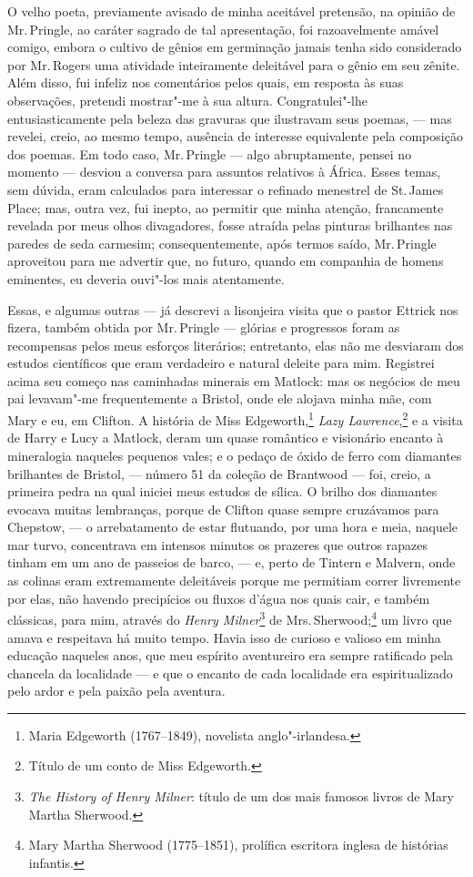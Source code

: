 O velho poeta, previamente avisado de minha aceitável pretensão, na
opinião de Mr.\,Pringle, ao caráter sagrado de tal apresentação, foi
razoavelmente amável comigo, embora o cultivo de gênios em germinação
jamais tenha sido considerado por Mr.\,Rogers uma atividade inteiramente
deleitável para o gênio em seu zênite. Além disso, fui infeliz nos
comentários pelos quais, em resposta às suas observações, pretendi
mostrar"-me à sua altura. Congratulei"-lhe entusiasticamente pela beleza
das gravuras que ilustravam seus poemas, --- mas revelei, creio, ao mesmo
tempo, ausência de interesse equivalente pela composição dos poemas. Em
todo caso, Mr.\,Pringle --- algo abruptamente, pensei no momento --- desviou
a conversa para assuntos relativos à África. Esses temas, sem dúvida,
eram calculados para interessar o refinado menestrel de St.\,James Place;
mas, outra vez, fui inepto, ao permitir que minha atenção, francamente
revelada por meus olhos divagadores, fosse atraída pelas pinturas
brilhantes nas paredes de seda carmesim; consequentemente, após termos
saído, Mr.\,Pringle aproveitou para me advertir que, no futuro, quando em
companhia de homens eminentes, eu deveria ouvi"-los mais atentamente.

Essas, e algumas outras --- já descrevi a lisonjeira visita que o
pastor Ettrick nos fizera, também obtida por Mr.\,Pringle --- glórias e
progressos foram as recompensas pelos meus esforços literários;
entretanto, elas não me desviaram dos estudos científicos que eram
verdadeiro e natural deleite para mim. Registrei acima seu começo nas
caminhadas minerais em Matlock: mas os negócios de meu pai levavam"-me
frequentemente a Bristol, onde ele alojava minha mãe, com Mary e eu, em
Clifton. A história de Miss Edgeworth,\footnote{Maria Edgeworth
  (1767--1849), novelista anglo"-irlandesa.} \textit{Lazy
Lawrence},\footnote{Título de um conto de Miss Edgeworth.}
e a visita de Harry e Lucy a Matlock, deram um quase romântico e
visionário encanto à mineralogia naqueles pequenos vales; e o pedaço de
óxido de ferro com diamantes brilhantes de Bristol, --- número 51 da coleção
de Brantwood --- foi, creio, a primeira pedra na qual iniciei meus
estudos de sílica. O brilho dos diamantes evocava muitas lembranças,
porque de Clifton quase sempre cruzávamos para Chepstow, --- o
arrebatamento de estar flutuando, por uma hora e meia, naquele mar
turvo, concentrava em intensos minutos os prazeres que outros rapazes
tinham em um ano de passeios de barco, --- e, perto de Tintern e Malvern,
onde as colinas eram extremamente deleitáveis porque me permitiam correr
livremente por elas, não havendo precipícios ou fluxos d'água nos quais
cair, e também clássicas, para mim, através do \textit{Henry
Milner}\footnote{\textit{The History of Henry Milner}: título de um dos
  mais famosos livros de Mary Martha Sherwood.} de Mrs.\,Sherwood;\footnote{Mary Martha Sherwood (1775--1851), prolífica escritora
  inglesa de histórias infantis.} um livro que amava e
respeitava há muito tempo. Havia isso de curioso e valioso em minha
educação naqueles anos, que meu espírito aventureiro era sempre
ratificado pela chancela da localidade --- e que o encanto de cada
localidade era espiritualizado pelo ardor e pela paixão pela aventura.

